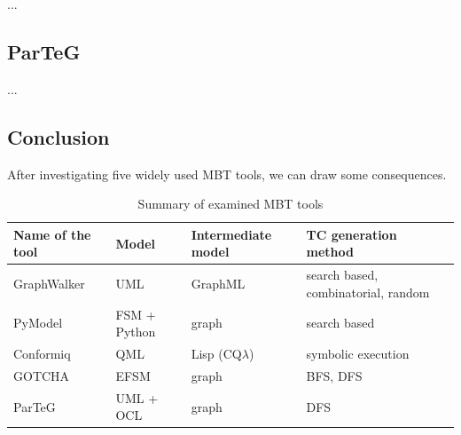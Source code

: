 ...


\subsection{ParTeG}
\label{sub:parteg}

...


\subsection{Conclusion}
\label{sub:conclusion}

After investigating five widely used MBT tools, we can draw some consequences.

\begin{table}[htb]
\begin{center}
\begin{tabular}{|l|l|l|l|}
\hline
	\textbf{Name of the tool} & \textbf{Model} & \textbf{Intermediate model} & \textbf{TC generation method}\\\hline
	GraphWalker & UML & GraphML & search based, combinatorial, random\\\hline
	PyModel & FSM + Python & graph & search based\\\hline
	Conformiq & QML & Lisp (CQ$\lambda$) & symbolic execution\\\hline
	GOTCHA & EFSM & graph & BFS, DFS\\\hline
	ParTeG & UML + OCL & graph & DFS\\
\hline
\end{tabular}
\end{center}
\caption{\label{tab:toolssummary} Summary of examined MBT tools}
\end{table}

